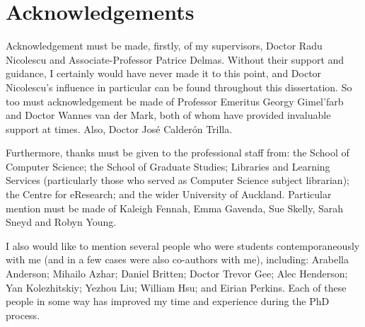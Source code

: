 

\chapter*{Acknowledgements}

Acknowledgement must be made, firstly, of my supervisors, Doctor Radu Nicolescu and Associate-Professor Patrice Delmas.  Without their support and guidance, I certainly would have never made it to this point, and Doctor Nicolescu's influence in particular can be found throughout this dissertation.  So too must acknowledgement be made of Professor Emeritus Georgy Gimel'farb and Doctor Wannes van der Mark, both of whom have provided invaluable support at times.  Also, Doctor José Calderón Trilla.

Furthermore, thanks must be given to the professional staff from: the School of Computer Science; the School of Graduate Studies; Libraries and Learning Services (particularly those who served as Computer Science subject librarian); the Centre for eResearch; and the wider University of Auckland.  Particular mention must be made of Kaleigh Fennah, Emma Gavenda, Sue Skelly, Sarah Sneyd and Robyn Young.

I also would like to mention several people who were students contemporaneously with me (and in a few cases were also co-authors with me), including: Arabella Anderson; Mihailo Azhar; Daniel Britten; Doctor Trevor Gee; Alec Henderson; Yan Kolezhitskiy; Yezhou Liu; William Hsu; and Eirian Perkins.  Each of these people in some way has improved my time and experience during the PhD process.

